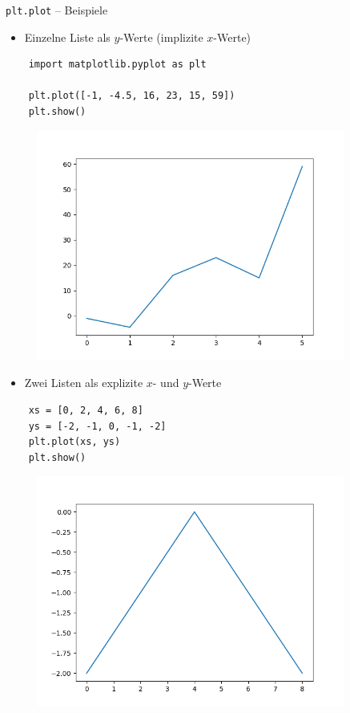 \documentclass[utf8, smaller, c]{beamer}
\renewcommand{\tt}[1]{{\texttt{#1}}}
\begin{document}
\begin{frame}[fragile]{\tt{plt.plot} -- Beispiele}
	\begin{minipage}[t]{0.45\textwidth}
		\begin{itemize}
			\item Einzelne Liste als $y$-Werte (implizite $x$-Werte)
		\end{itemize}
		\begin{lstlisting}
	import matplotlib.pyplot as plt
	
	plt.plot([-1, -4.5, 16, 23, 15, 59])
	plt.show()
		\end{lstlisting}
		\begin{figure}
			\includegraphics[width=0.9\textwidth]{pics/plot1}
		\end{figure}
	\end{minipage}
	\begin{minipage}[t]{0.45\textwidth}
		\begin{itemize}
			\item Zwei Listen als explizite $x$- und $y$-Werte
		\end{itemize}
		\begin{lstlisting}
	xs = [0, 2, 4, 6, 8]
	ys = [-2, -1, 0, -1, -2]
	plt.plot(xs, ys)
	plt.show()
		\end{lstlisting}
		\begin{figure}
			\includegraphics[width=0.9\textwidth]{pics/plot2}
		\end{figure}
	\end{minipage}
\end{frame}
\end{document}
